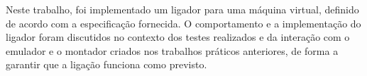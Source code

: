 \documentclass[12pt,a4paper]{article}
\numberwithin{equation}{section}
\begin{document}
Neste trabalho, foi implementado um ligador para uma máquina virtual, definido de acordo com a especificação fornecida. O comportamento e a implementação do ligador foram discutidos no contexto dos testes realizados e da interação com o emulador e o montador criados nos trabalhos práticos anteriores, de forma a garantir que a ligação funciona como previsto.







\end{document}

